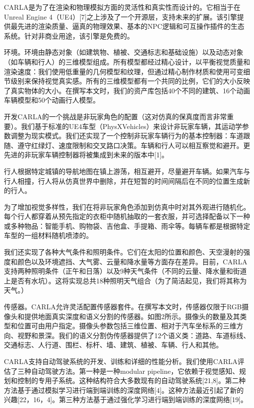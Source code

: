 CARLA是为了在渲染和物理模拟方面的灵活性和真实性而设计的。它相当于在Unreal Engine 4（UE4）[7]之上涉及了一个开源层，支持未来的扩展。该引擎提供最先进的渲染质量、逼真的物理效果、基本的NPC逻辑和可互操作插件的生态系统。针对非商业用途，该引擎是免费的。

环境。环境由静态对象（如建筑物、植被、交通标志和基础设施）以及动态对象（如车辆和行人）的三维模型组成。所有模型都经过精心设计，以平衡视觉质量和渲染速度：我们使用低重量的几何模型和纹理，但通过精心制作材质和使用可变细节级别来保持视觉真实感。所有的三维模型都有一个共同的比例，它们的大小反映了真实物体的大小。在撰写本文时，我们的资产库包括40个不同的建筑、16个动画车辆模型和50个动画行人模型。

开发CARLA的一个挑战是非玩家角色的配置（这对仿真的保真度而言非常重要）。我们基于标准的UE4车型（PhysXVehicles）来设计非玩家车辆，其运动学参数调整为现实模式。我们还实现了一个控制非玩家车辆行为的基本控制器：车道跟随、遵守红绿灯、速度限制和交叉路口决策。车辆和行人可以相互察觉和避开。更先进的非玩家车辆控制器将被集成到未来的版本中[1]。

行人根据特定城镇的导航地图在镇上游荡，相互避开，尽量避开车辆。如果汽车与行人相撞，行人将从仿真世界中删除，并在短暂的时间间隔后在不同的位置生成新的行人。

为了增加视觉多样性，我们在将非玩家角色添加到仿真中时对其外观进行随机化。每个行人都穿着从预先指定的衣柜中随机抽取的一套衣服，并可选择配备以下一种或多种物品：智能手机、购物袋、吉他盒、手提箱、雨伞等。每辆车都是根据特定车型的一组材料随机喷漆的。

我们还实现了各种大气条件和照明条件。它们在太阳的位置和颜色、天空漫射的强度和颜色以及环境遮挡、大气雾、云量和降水量等方面存在差异。目前，CARLA支持两种照明条件（正午和日落）以及9种天气条件（不同的云量、降水量和街道上是否有水坑）。这将实现总共18种照明天气组合（为了简洁起见，我们将其称为天气。）

传感器。CARLA允许灵活配置传感器套件。在撰写本文时，传感器仅限于RGB摄像头和提供地面真实深度和语义分割的传感器。如图2所示。摄像头的数量及其类型和位置可由用户指定。摄像头参数包括三维位置、相对于汽车坐标系的三维方向、视野和景深。我们的语义分割伪传感器提供了12个语义类：道路、车道标线、交通标志、人行道、围栏、标杆、墙、建筑、植被、车辆、行人和其他。

CARLA支持自动驾驶系统的开发、训练和详细的性能分析。我们使用CARLA评估了三种自动驾驶方法。第一种是一种modular pipeline，它依赖于视觉感知、规划和控制的专用子系统。这种结构符合大多数现有的自动驾驶系统[21,8]。第二种方法基于通过模拟学习进行端到端训练的深度网络[4]。这种方法最近引起了新的兴趣[22，16，4]。第三种方法基于通过强化学习进行端到端训练的深度网络[19]。

